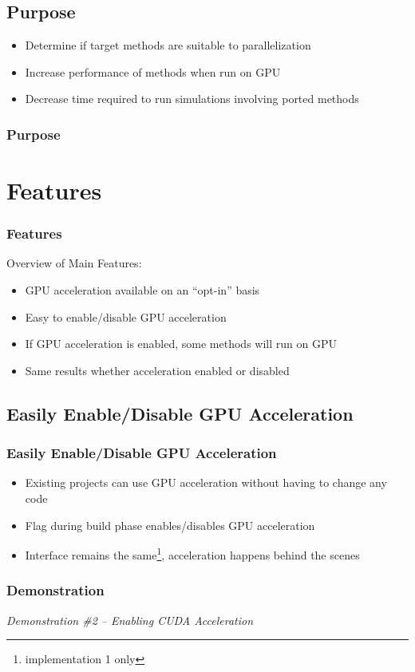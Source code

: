 \documentclass{beamer}
\begin{document}
\subsection{Purpose}
\begin{frame}
\begin{itemize}
\item Determine if target methods are suitable to parallelization 
\item Increase performance of methods when run on GPU
\item Decrease time required to run simulations involving ported methods
\end{itemize}
\frametitle{Purpose}
\end{frame}

\section{Features}
\begin{frame}
\frametitle{Features}
Overview of Main Features:
\begin{itemize}
\item GPU acceleration available on an ``opt-in'' basis
\item Easy to enable/disable GPU acceleration
\item If GPU acceleration is enabled, some methods will run on GPU
\item Same results whether acceleration enabled or disabled
\end{itemize}
\end{frame}

\subsection{Easily Enable/Disable GPU Acceleration}
\begin{frame}
\frametitle{Easily Enable/Disable GPU Acceleration}
\begin{itemize}
\item Existing projects can use GPU acceleration without having to change any code 
\item Flag during build phase enables/disables GPU acceleration
\item Interface remains the same\footnote{implementation 1 only}, acceleration happens behind the scenes
\end{itemize}
\end{frame}

\begin{frame}
\frametitle{Demonstration}
\begin{center}
\emph{Demonstration  \#2 -- Enabling CUDA Acceleration}
\end{center}
\end{frame}
\end{document}
